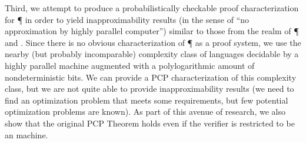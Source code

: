 \documentclass{article}
\begin{document}
Third, we attempt to produce a probabilistically checkable proof characterization for \P{} in order to yield inapproximability results (in the sense of ``no approximation by highly parallel computer'') similar to those from the realm of \P{} and \NP.
Since there is no obvious characterization of \P{} as a proof system, we use the nearby (but probably incomparable) complexity class of languages decidable by a highly parallel machine augmented with a polylogarithmic amount of nondeterministic bits.
We can provide a PCP characterization of this complexity class, but we are not quite able to provide inapproximability results (we need to find an optimization problem that meets some requirements, but few potential optimization problems are known).
As part of this avenue of research, we also show that the original PCP Theorem holds even if the verifier is restricted to be an \NC{} machine.
\end{document}
